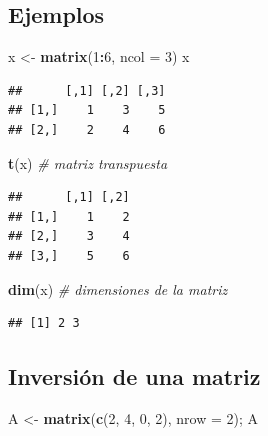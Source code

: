 \documentclass[]{book}
\newenvironment{Shaded}{\begin{snugshade}}{\end{snugshade}}
\newcommand{\CommentTok}[1]{\textcolor[rgb]{0.56,0.35,0.01}{\textit{#1}}}
\newcommand{\DataTypeTok}[1]{\textcolor[rgb]{0.13,0.29,0.53}{#1}}
\newcommand{\DecValTok}[1]{\textcolor[rgb]{0.00,0.00,0.81}{#1}}
\newcommand{\KeywordTok}[1]{\textcolor[rgb]{0.13,0.29,0.53}{\textbf{#1}}}
\newcommand{\NormalTok}[1]{#1}
\newcommand{\OperatorTok}[1]{\textcolor[rgb]{0.81,0.36,0.00}{\textbf{#1}}}
\newcommand{\StringTok}[1]{\textcolor[rgb]{0.31,0.60,0.02}{#1}}
\begin{document}
\hypertarget{ejemplos}{%
\subsection{Ejemplos}\label{ejemplos}}

\begin{Shaded}
\begin{Highlighting}[]
\NormalTok{x <-}\StringTok{ }\KeywordTok{matrix}\NormalTok{(}\DecValTok{1}\OperatorTok{:}\DecValTok{6}\NormalTok{, }\DataTypeTok{ncol =} \DecValTok{3}\NormalTok{)}
\NormalTok{x}
\end{Highlighting}
\end{Shaded}

\begin{verbatim}
##      [,1] [,2] [,3]
## [1,]    1    3    5
## [2,]    2    4    6
\end{verbatim}

\begin{Shaded}
\begin{Highlighting}[]
\KeywordTok{t}\NormalTok{(x)  }\CommentTok{# matriz transpuesta}
\end{Highlighting}
\end{Shaded}

\begin{verbatim}
##      [,1] [,2]
## [1,]    1    2
## [2,]    3    4
## [3,]    5    6
\end{verbatim}

\begin{Shaded}
\begin{Highlighting}[]
\KeywordTok{dim}\NormalTok{(x)  }\CommentTok{# dimensiones de la matriz}
\end{Highlighting}
\end{Shaded}

\begin{verbatim}
## [1] 2 3
\end{verbatim}

\hypertarget{inversion-de-una-matriz}{%
\subsection{Inversión de una matriz}\label{inversion-de-una-matriz}}

\begin{Shaded}
\begin{Highlighting}[]
\NormalTok{A <-}\StringTok{ }\KeywordTok{matrix}\NormalTok{(}\KeywordTok{c}\NormalTok{(}\DecValTok{2}\NormalTok{, }\DecValTok{4}\NormalTok{, }\DecValTok{0}\NormalTok{, }\DecValTok{2}\NormalTok{), }\DataTypeTok{nrow =} \DecValTok{2}\NormalTok{); A}
\end{Highlighting}
\end{Shaded}
\end{document}
